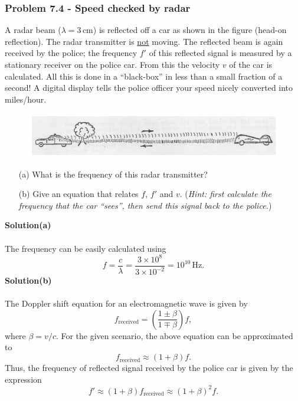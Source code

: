 \documentclass[12pt,a4paper]{article}
\begin{document}
\subsubsection*{Problem 7.4 - Speed checked by radar}
A radar beam ($\lambda=3\,$cm) is reflected off a car as shown in the figure (head-on reflection). The radar transmitter is \underline{not} moving. The reflected beam is again received by the police; the frequency $f'$ of this reflected signal is measured by a stationary receiver on the police car. From this the velocity $v$ of the car is calculated. All this is done in a “black-box” in less than a small fraction of a second! A digital display tells the police officer your speed nicely converted into miles/hour.
\begin{figure}[h]
    \centering
    \includegraphics[width=1\linewidth]{figs/fig_prob_7.4.png}
\end{figure}
\begin{enumerate}
    \item[(a)]What is the frequency of this radar transmitter?
    \item[(b)]Give an equation that relates $f$, $f'$ and $v$. (\textit{Hint: first calculate the frequency that the car “sees”, then send this signal back to the police.})
\end{enumerate}
\textbf{Solution(a)}
\\
\\The frequency can be easily calculated using
\[f=\frac{c}{\lambda}=\frac{3\times10^8}{3\times10^{-2}}=10^{10}\,\text{Hz}.\]
\textbf{Solution(b)}
\\
\\The Doppler shift equation for an electromagnetic wave is given by
\begin{equation}
    f_{\text{received}}=\left(\frac{1\pm\beta}{1\mp\beta}\right)f,
\end{equation}
where $\beta=v/c$. For the given scenario, the above equation can be approximated to
\[f_{\text{received}}\approx(1+\beta)f.\]
Thus, the frequency of reflected signal received by the police car is given by the expression
\[f'\approx(1+\beta)f_{\text{received}}\approx(1+\beta)^2f.\]
\end{document}
